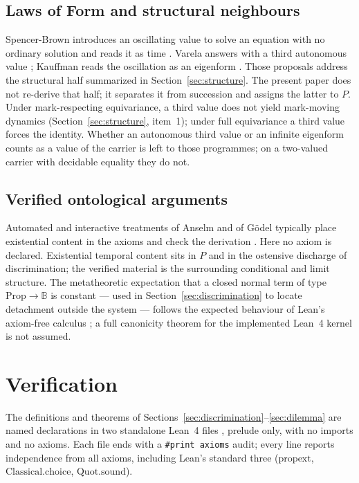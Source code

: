 \documentclass[11pt]{article}
\newcommand{\lf}[1]{\texttt{#1}}
\newcommand{\B}{\mathbb{B}}
\begin{document}
\subsection{Laws of Form and structural neighbours}

Spencer-Brown introduces an oscillating value to solve an equation with no
ordinary solution and reads it as time \cite{spencerbrown1969}. Varela answers
with a third autonomous value \cite{varela1975}; Kauffman reads the oscillation
as an eigenform \cite{kauffman1987,kauffmanvarela1980}. Those proposals address
the structural half summarized in Section~\ref{sec:structure}. The present
paper does not re-derive that half; it separates it from succession and assigns
the latter to \(P\). Under mark-respecting equivariance, a third value does not
yield mark-moving dynamics (Section~\ref{sec:structure}, item~1); under full
equivariance a third value forces the identity. Whether an autonomous third
value or an infinite eigenform counts as a value of the carrier is left to
those programmes; on a two-valued carrier with decidable equality they do not.

\subsection{Verified ontological arguments}

Automated and interactive treatments of Anselm and of Gödel typically place
existential content in the axioms and check the derivation
\cite{oppenheimerzalta2011,benzmuller2014,sobel1987,benzmuller2016,anderson1990}.
Here no axiom is declared. Existential temporal content sits in \(P\) and in
the ostensive discharge of discrimination; the verified material is the
surrounding conditional and limit structure. The metatheoretic expectation that
a closed normal term of type \(\mathrm{Prop}\to\B\) is constant --- used in
Section~\ref{sec:discrimination} to locate detachment outside the system ---
follows the expected behaviour of Lean's axiom-free calculus
\cite{carneiro2019}; a full canonicity theorem for the implemented Lean~4
kernel is not assumed.

\section{Verification}
\label{sec:mech}

The definitions and theorems of Sections~\ref{sec:discrimination}--\ref{sec:dilemma}
are named declarations in two standalone Lean~4 files \cite{demoura2021},
prelude only, with no imports and no axioms. Each file ends with a
\lf{\#print axioms} audit; every line reports independence from all axioms,
including Lean's standard three (\(\mathrm{propext}\),
\(\mathrm{Classical.choice}\), \(\mathrm{Quot.sound}\)).
\end{document}
